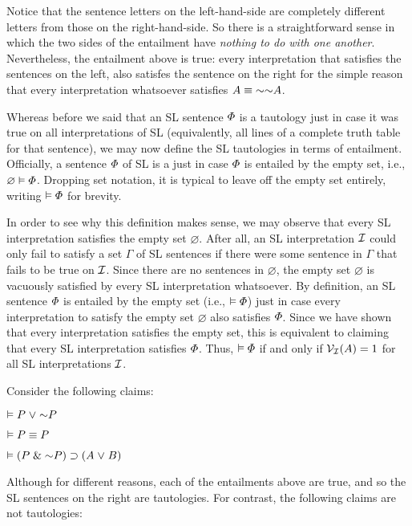 Notice that the sentence letters on the left-hand-side are completely different letters from those on the right-hand-side.
So there is a straightforward sense in which the two sides of the entailment have \emph{nothing to do with one another}.
Nevertheless, the entailment above is true: every interpretation that satisfies the sentences on the left, also satisfes the sentence on the right for the simple reason that every interpretation whatsoever satisfies $A\eiff\enot\enot A$.

Whereas before we said that an SL sentence $\varPhi$ is a tautology just in case it was true on all interpretations of SL (equivalently, all lines of a complete truth table for that sentence), we may now define the SL tautologies in terms of entailment.
Officially, a sentence $\varPhi$ of SL is a  just in case $\varPhi$ is entailed by the empty set, i.e., $\varnothing \vDash \varPhi$.
Dropping set notation, it is typical to leave off the empty set entirely, writing $\vDash \varPhi$ for brevity.

In order to see why this definition makes sense, we may observe that every SL interpretation satisfies the empty set $\varnothing$.
After all, an SL interpretation $\mathcal{I}$ could only fail to satisfy a set $\Gamma$ of SL sentences if there were some sentence in $\Gamma$ that fails to be true on $\mathcal{I}$.
Since there are no sentences in $\varnothing$, the empty set $\varnothing$ is vacuously satisfied by every SL interpretation whatsoever.
By definition, an SL sentence $\varPhi$ is entailed by the empty set (i.e., $\vDash \varPhi$) just in case every interpretation to satisfy the empty set $\varnothing$ also satisfies $\varPhi$.
Since we have shown that every interpretation satisfies the empty set, this is equivalent to claiming that every SL interpretation satisfies $\varPhi$. 
Thus, $\vDash \varPhi$ if and only if $\mathcal{V}_{\mathcal{I}}(A)=1$ for all SL interpretations $\mathcal{I}$.   

Consider the following claims:

\begin{earg}
  \item[] $\models P \eor \enot P$
  \item[] $\vDash P \equiv P$
  \item[] $\models (P \eand\enot P)\eif (A \eor B)$
\end{earg}

Although for different reasons, each of the entailments above are true, and so the SL sentences on the right are tautologies.
For contrast, the following claims are not tautologies:


